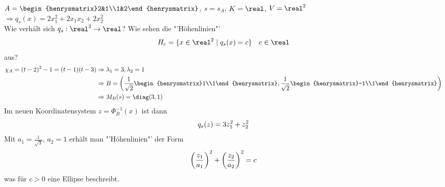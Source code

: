 \begin{example}
	$A=\begin{henrysmatrix}2&1\\1&2\end{henrysmatrix}$, $s=s_A$, $K=\real$, $V=\real^2$ \\
	$\Rightarrow q_s(x)=2x_1^2+2x_1x_2+2x_2^2$ \\
	Wie verhält sich $q_s:\real^2\to\real$? Wie sehen die "'Höhenlinien"'
	\begin{align}
		H_c=\{x\in\real^2\mid q_s(x)=c\}\quad c\in\real\notag
	\end{align}
	aus?
	\begin{align}
		\chi_A=(t-2)^2-1=(t-1)(t-3)&\Rightarrow \lambda_1=3,\lambda_2=1\notag \\
		&\Rightarrow B=\left( \frac{1}{\sqrt{2}}\begin{henrysmatrix}1\\1\end{henrysmatrix},\frac{1}{\sqrt{2}}\begin{henrysmatrix}-1\\1\end{henrysmatrix}\right)\notag \\
		&\Rightarrow M_B(s)=\diag(3,1)\notag
	\end{align}
	Im neuen Koordinatensystem $z=\Phi_B^{-1}(x)$ ist dann
	\begin{align}
		q_s(z)=3z_1^2+z_2^2\notag
	\end{align}
	Mit $a_1=\frac{1}{\sqrt{3}}$, $a_2=1$ erhält man "'Höhenlinien"' der Form
	\begin{align}
		\left(\frac{z_1}{a_1}\right)^2+\left( \frac{z_2}{a_2}\right)^2=c\notag
	\end{align}
	was für $c>0$ eine Ellipse beschreibt.
	\begin{center}
	\end{center}
\end{example}

